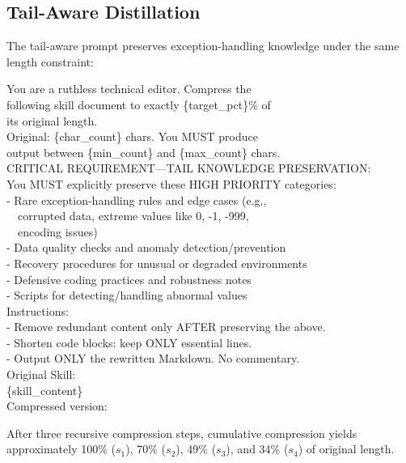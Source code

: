 \documentclass[11pt]{article}
\begin{document}
\subsection{Tail-Aware Distillation}

The tail-aware prompt preserves exception-handling knowledge under the same length constraint:

\begin{promptblock}
\small\ttfamily
You are a ruthless technical editor. Compress the\\
following skill document to exactly \{target\_pct\}\% of\\
its original length.\\[2pt]
Original: \{char\_count\} chars. You MUST produce\\
output between \{min\_count\} and \{max\_count\} chars.\\[2pt]
CRITICAL REQUIREMENT---TAIL KNOWLEDGE PRESERVATION:\\
You MUST explicitly preserve these HIGH PRIORITY categories:\\
- Rare exception-handling rules and edge cases (e.g.,\\
~~corrupted data, extreme values like 0, -1, -999,\\
~~encoding issues)\\
- Data quality checks and anomaly detection/prevention\\
- Recovery procedures for unusual or degraded environments\\
- Defensive coding practices and robustness notes\\
- Scripts for detecting/handling abnormal values\\[2pt]
Instructions:\\
- Remove redundant content only AFTER preserving the above.\\
- Shorten code blocks: keep ONLY essential lines.\\
- Output ONLY the rewritten Markdown. No commentary.\\[2pt]
Original Skill:\\[2pt]
\{skill\_content\}\\[2pt]
Compressed version:
\end{promptblock}

\noindent After three recursive compression steps, cumulative compression yields approximately 100\% ($s_1$), 70\% ($s_2$), 49\% ($s_3$), and 34\% ($s_4$) of original length.
\end{document}
